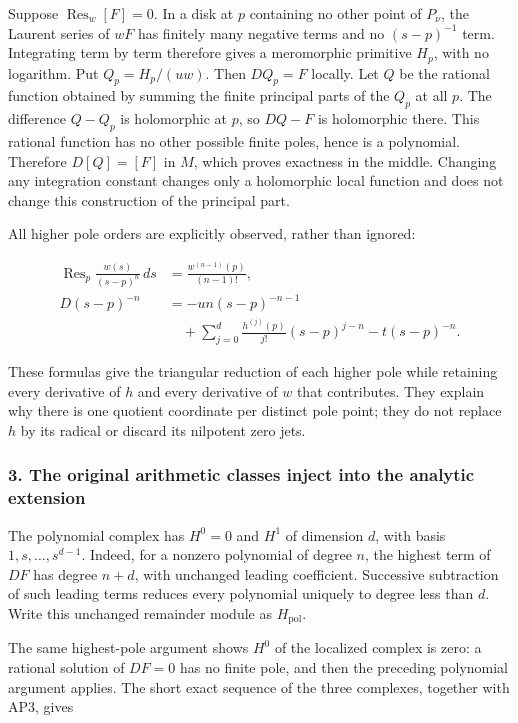 \documentclass{article}
\begin{document}
Suppose \(\operatorname{Res}_w[F]=0\). In a disk at \(p\) containing no other point of \(P_{\nu}\), the Laurent series of \(wF\) has finitely many negative terms and no \((s-p)^{-1}\) term. Integrating term by term therefore gives a meromorphic primitive \(H_p\), with no logarithm. Put \(Q_p=H_p/(u w)\). Then \(D Q_p=F\) locally. Let \(Q\) be the rational function obtained by summing the finite principal parts of the \(Q_p\) at all \(p\). The difference \(Q-Q_p\) is holomorphic at \(p\), so \(DQ-F\) is holomorphic there. This rational function has no other possible finite poles, hence is a polynomial. Therefore \(D[Q]=[F]\) in \(M\), which proves exactness in the middle. Changing any integration constant changes only a holomorphic local function and does not change this construction of the principal part.

All higher pole orders are explicitly observed, rather than ignored:

\[
\begin{aligned}
\operatorname{Res}_p\frac{w(s)}{(s-p)^n}\,ds
&=\frac{w^{(n-1)}(p)}{(n-1)!},\\
D(s-p)^{-n}&=-u n(s-p)^{-n-1}\\
&\quad+\sum_{j=0}^d\frac{h^{(j)}(p)}{j!}(s-p)^{j-n}
-t(s-p)^{-n}.
\end{aligned}
\tag{AP4}
\]

These formulas give the triangular reduction of each higher pole while retaining every derivative of \(h\) and every derivative of \(w\) that contributes. They explain why there is one quotient coordinate per distinct pole point; they do not replace \(h\) by its radical or discard its nilpotent zero jets.

\subsubsection{3. The original arithmetic classes inject into the analytic extension}\label{endpoint-analytic_pole--the-original-arithmetic-classes-inject-into-the-analytic-extension}

The polynomial complex has \(H^0=0\) and \(H^1\) of dimension \(d\), with basis \(1,s,\ldots,s^{d-1}\). Indeed, for a nonzero polynomial of degree \(n\), the highest term of \(DF\) has degree \(n+d\), with unchanged leading coefficient. Successive subtraction of such leading terms reduces every polynomial uniquely to degree less than \(d\). Write this unchanged remainder module as \(H_{\mathrm{pol}}\).

The same highest-pole argument shows \(H^0\) of the localized complex is zero: a rational solution of \(DF=0\) has no finite pole, and then the preceding polynomial argument applies. The short exact sequence of the three complexes, together with AP3, gives
\end{document}
